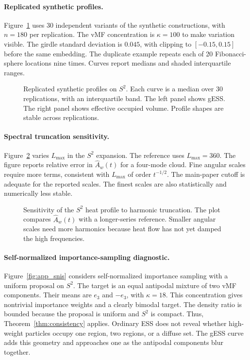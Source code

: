 \documentclass[twoside]{article}
\theoremstyle{definition}
\theoremstyle{remark}
\begin{document}
\paragraph{Replicated synthetic profiles.}

Figure~\ref{fig:app_replicates} uses 30 independent variants of the synthetic constructions, with $n=180$ per replication. The vMF concentration is $\kappa=100$ to make variation visible. The girdle standard deviation is $0.045$, with clipping to $[-0.15,0.15]$ before the same embedding. The duplicate example repeats each of 20 Fibonacci-sphere locations nine times.
Curves report medians and shaded interquartile ranges.


\begin{figure}[t]
\centering

\caption{Replicated synthetic profiles on $S^2$. Each curve is a median over 30 replications, with an interquartile band.
The left panel shows gESS. The right panel shows effective occupied volume. Profile shapes are stable across replications.}
\label{fig:app_replicates}
\end{figure}

\paragraph{Spectral truncation sensitivity.}
Figure~\ref{fig:app_truncation} varies $L_{\max}$ in the $S^2$ expansion. The reference uses $L_{\max}=360$. The figure reports relative error in $\widehat A_w(t)$ for a four-mode cloud. Fine angular scales require more terms, consistent with $L_{\max}$ of order $t^{-1/2}$. The main-paper cutoff is adequate for the reported scales. The finest scales are also statistically and numerically less stable.

\begin{figure}[t]
\centering

\caption{Sensitivity of the $S^2$ heat profile to harmonic truncation. The plot compares $\widehat A_w(t)$ with a longer-series reference.
Smaller angular scales need more harmonics because heat flow has not yet damped the high frequencies.}
\label{fig:app_truncation}
\end{figure}

\paragraph{Self-normalized importance-sampling diagnostic.}
Figure~\ref{fig:app_snis} considers self-normalized importance sampling with a uniform proposal on $S^2$. The target is an equal antipodal mixture of two vMF components. Their means are $e_3$ and $-e_3$, with $\kappa=18$. This concentration gives nontrivial importance weights and a clearly bimodal target. The density ratio is bounded because the proposal is uniform and $S^2$ is compact. Thus, Theorem~\ref{thm:consistency} applies. Ordinary ESS does not reveal whether high-weight particles occupy one region, two regions, or a diffuse set. The gESS curve adds this geometry and approaches one as the antipodal components blur together.
\end{document}
